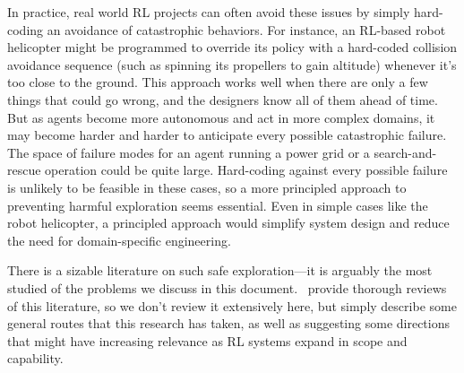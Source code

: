 \documentclass[a4paper,10pt]{article}
\begin{document}
In practice, real world RL projects can often avoid these issues by simply hard-coding an avoidance of catastrophic behaviors.  For instance, an RL-based robot helicopter might be programmed to override its policy with a hard-coded collision avoidance sequence (such as spinning its propellers to gain altitude) whenever it's too close to the ground.  This approach works well when there are only a few things that could go wrong, and the designers know all of them ahead of time.  But as agents become more autonomous and act in more complex domains, it may become harder and harder to anticipate every possible catastrophic failure.  The space of failure modes for an agent running a power grid or a search-and-rescue operation could be quite large.  Hard-coding against every possible failure is unlikely to be feasible in these cases, so a more principled approach to preventing harmful exploration seems essential.  Even in simple cases like the robot helicopter, a principled approach would simplify system design and reduce the need for domain-specific engineering.

There is a sizable literature on such safe exploration---it is arguably the most studied of the problems we discuss in this document.~\cite{garcia2015comprehensive,pecka2014safe} provide thorough reviews of this literature, so we don’t review it extensively here, but simply describe some general routes that this research has taken, as well as suggesting some directions that might have increasing relevance as RL systems expand in scope and capability.
\end{document}
